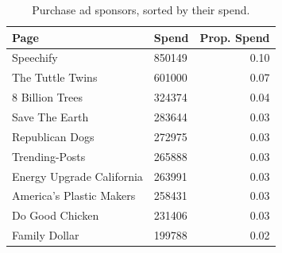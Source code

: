 \begin{table}[ht]
\centering
\begin{tabular}{llr}
  \hline
Page & Spend & Prop. Spend \\ 
  \hline
Speechify & 850149 & 0.10 \\ 
  The Tuttle Twins & 601000 & 0.07 \\ 
  8 Billion Trees & 324374 & 0.04 \\ 
  Save The Earth & 283644 & 0.03 \\ 
  Republican Dogs & 272975 & 0.03 \\ 
  Trending-Posts & 265888 & 0.03 \\ 
  Energy Upgrade California & 263991 & 0.03 \\ 
  America's Plastic Makers & 258431 & 0.03 \\ 
  Do Good Chicken & 231406 & 0.03 \\ 
  Family Dollar & 199788 & 0.02 \\ 
   \hline
\end{tabular}
\caption{Purchase ad sponsors, sorted by their spend.} 
\label{tab:purchase_sponsors}
\end{table}
